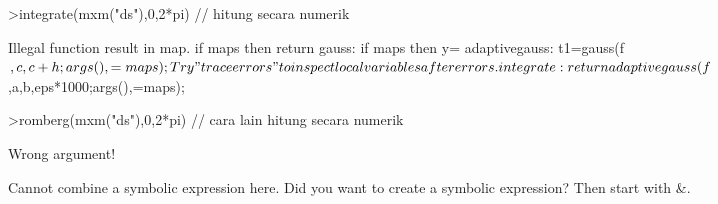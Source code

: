 \documentclass[12pt,arial,letterpaper]{book}
\begin{document}
\begin{eulernootebook}
\begin{eulercomment}
\begin{eulercomment}
\begin{eulernootebook}
\begin{eulercomment}
\begin{eulercomment}
\begin{eulercomment}
\begin{eulercomment}
\begin{eulercomment}
\begin{eulercomment}
\begin{eulernotebook}
\begin{eulercomment}
\begin{eulercomment}
\begin{eulercomment}
\begin{eulercomment}
\begin{eulercomment}
\begin{eulercomment}
\begin{eulercomment}
\begin{eulercomment}
\begin{eulercomment}
\begin{eulercomment}
\begin{eulercomment}
\begin{eulercomment}
\begin{eulercomment}
\begin{eulercomment}
\begin{eulercomment}
\begin{eulercomment}
\begin{eulerprompt}
>integrate(mxm("ds"),0,2*pi) // hitung secara numerik
\end{eulerprompt}
\begin{euleroutput}
  Illegal function result in map.
      if maps then return %
  gauss:
      if maps then y=%
  adaptivegauss:
      t1=gauss(f$,c,c+h;args(),=maps);
  Try "trace errors" to inspect local variables after errors.
  integrate:
      return adaptivegauss(f$,a,b,eps*1000;args(),=maps);
\end{euleroutput}
\begin{eulerprompt}
>romberg(mxm("ds"),0,2*pi) // cara lain hitung secara numerik
\end{eulerprompt}
\begin{euleroutput}
  Wrong argument!
  
  Cannot combine a symbolic expression here.
  Did you want to create a symbolic expression?
  Then start with &.
  

\end{euleroutput}
\end{eulercomment}
\end{eulercomment}
\end{eulercomment}
\end{eulercomment}
\end{eulercomment}
\end{eulercomment}
\end{eulercomment}
\end{eulercomment}
\end{eulercomment}
\end{eulercomment}
\end{eulercomment}
\end{eulercomment}
\end{eulercomment}
\end{eulercomment}
\end{eulercomment}
\end{eulercomment}
\end{eulernotebook}
\end{eulercomment}
\end{eulercomment}
\end{eulercomment}
\end{eulercomment}
\end{eulercomment}
\end{eulercomment}
\end{eulernootebook}
\end{eulercomment}
\end{eulercomment}
\end{eulernootebook}
\end{document}
